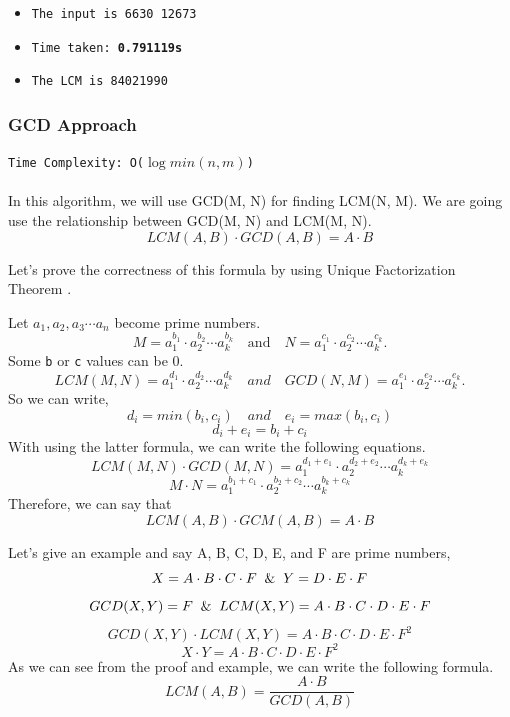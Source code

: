 \documentclass[12pt]{article}
\begin{document}
\begin{itemize}
  \item \texttt{The input is 6630 12673} 
  \item \texttt{Time taken: \textbf{0.791119s}} 
  \item \texttt{The LCM is 84021990}
\end{itemize}

\subsubsection{GCD Approach }
\texttt{Time Complexity: O($\log{min(n,m)}$) } \\ \\
In this algorithm, we will use GCD(M, N) for finding LCM(N, M). We are going use the relationship between GCD(M, N) and LCM(M, N).
\[ LCM(A, B) \cdot GCD(A, B) = A \cdot B\]

Let's prove the correctness of this formula by using Unique Factorization Theorem \cite{gcdapproachoflcm}.

Let $a_1, a_2, a_3 \cdots a_n$ become prime numbers.
\[ M=a_1^{b_1} \cdot a_2^{b_2} \cdots a_k^{b_k}\quad\text{and}\quad N=a_1^{c_1} \cdot a_2^{c_2} \cdots a_k^{c_k}. \]
Some \texttt{b} or \texttt{c} values can be 0.
\[ LCM(M, N)=a_1^{d_1} \cdot a_2^{d_2} \cdots a_k^{d_k}\quad{and}\quad GCD(N,M)=a_1^{e_1} \cdot a_2^{e_2} \cdots a_k^{e_k}.\]
So we can write, 
\[d_i = min(b_i, c_i) \quad{and}\quad e_i = max(b_i, c_i)\] 
\[d_i + e_i = b_i + c_i \]
With using the latter formula, we can write the following equations.
\[ LCM(M, N) \cdot GCD(M, N) = a_1^{d_1 + e_1} \cdot a_2^{d_2 + e_2} \cdots a_k^{d_k + e_k}\]
\[ M \cdot N = a_1^{b_1 + c_1} \cdot a_2^{b_2 + c_2} \cdots a_k^{b_k + c_k}\]
Therefore, we can say that 
\[ LCM(A, B) \cdot GCM(A, B) = A \cdot B\]

Let's give an example and say A, B, C, D, E, and F are prime numbers, 
\[ X =  A \cdot B \cdot C \cdot F \And Y = D \cdot E \cdot F\]
\[ GCD(X, Y) = F \And LCM(X, Y) =  A \cdot B \cdot C \cdot D \cdot E \cdot F \]
\[ GCD(X, Y) \cdot LCM(X, Y) = A \cdot B \cdot C \cdot D \cdot E \cdot F^{2} \]
\[ X \cdot Y = A \cdot B \cdot C \cdot D \cdot E \cdot F^{2} \]
As we can see from the proof and example, we can write the following formula.
\[ LCM(A, B) = \dfrac {A \cdot B} {GCD(A, B)} \]
\end{document}

